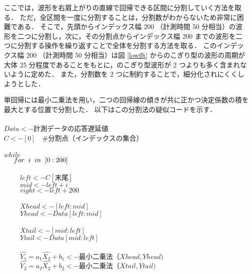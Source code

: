 \documentclass[a4j]{jarticle}
\begin{document}
ここでは，波形を右肩上がりの直線で回帰できる区間に分割していく方法を取る．
ただ，全区間を一度に分割することは，分割数がわからないため非常に困難である．
そこで，先頭からインデックス幅 200 （計測時間 50 分相当）の波形を二つに分割し，次に，その分割点からインデックス幅 200 までの波形を二つに分割する操作を繰り返すことで全体を分割する方法を取る．
このインデックス幅 200 （計測時間 50 分相当）は図 \ref{lowfft} からのこぎり型の波形の周期が大体 25 分程度であることをもとに，のこぎり型波形が 2 つよりも多く含まれないように定めた．
また，分割数を 2 つに制約することで，細分化されにくくしようとした．

単回帰には最小二乗法を用い，二つの回帰線の傾きが共に正かつ決定係数の積を最大とする位置で分割した．
以下はこの分割法の疑似コードを示す．\\
\\
$Data <- $計測データの応答遅延値\\
$C <- [0]$　\#分割点（インデックスの集合）\\
\\
$while$\\
$\hspace{0.5cm}for \hspace{0.2cm}i\hspace{0.2cm} in\hspace{0.2cm} [0:200]$\\
\\
$\hspace{1cm}left <- C[末尾]$\\
$\hspace{1cm}mid <- left+i$\\
$\hspace{1cm}right <- left + 200$\\
\\
$\hspace{1cm}Xhead <- [left : mid]$\\
$\hspace{1cm}Yhead <- Data[left : mid]$\\
\\
$\hspace{1cm}Xtail <- [mid : left]$\\
$\hspace{1cm}Ytail <- Data[mid : left]$\\
\\
$\hspace{1cm}\widehat{Y_1} = a_1\widehat{X_2} + b_1 <- 最小二乗法（Xhead,Yhead)$\\
$\hspace{1cm}\widehat{Y_2} = a_2\widehat{X_2} + b_2 <- 最小二乗法（Xtail,Ytail)$\\
\end{document}

